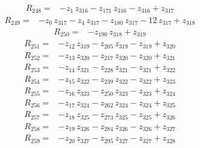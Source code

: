 \documentclass[10pt]{article}
\begin{document}
\begin{align*}
R_{248}={}& - z_{1}\,z_{316} - z_{171}\,z_{316} - z_{316} + z_{317}
\end{align*}
\begin{align*}
R_{249}={}& - z_{0}\,z_{317} - z_{4}\,z_{317} - z_{180}\,z_{317} - 12\,z_{317} + z_{318}
\end{align*}
\begin{align*}
R_{250}={}& - z_{190}\,z_{318} + z_{319}
\end{align*}
\begin{align*}
R_{251}={}& - z_{12}\,z_{319} - z_{205}\,z_{319} - z_{319} + z_{320}
\end{align*}
\begin{align*}
R_{252}={}& - z_{13}\,z_{320} - z_{217}\,z_{320} - z_{320} + z_{321}
\end{align*}
\begin{align*}
R_{253}={}& - z_{14}\,z_{321} - z_{228}\,z_{321} - z_{321} + z_{322}
\end{align*}
\begin{align*}
R_{254}={}& - z_{15}\,z_{322} - z_{239}\,z_{322} - z_{322} + z_{323}
\end{align*}
\begin{align*}
R_{255}={}& - z_{16}\,z_{323} - z_{250}\,z_{323} - z_{323} + z_{324}
\end{align*}
\begin{align*}
R_{256}={}& - z_{17}\,z_{324} - z_{262}\,z_{324} - z_{324} + z_{325}
\end{align*}
\begin{align*}
R_{257}={}& - z_{18}\,z_{325} - z_{273}\,z_{325} - z_{325} + z_{326}
\end{align*}
\begin{align*}
R_{258}={}& - z_{19}\,z_{326} - z_{284}\,z_{326} - z_{326} + z_{327}
\end{align*}
\begin{align*}
R_{259}={}& - z_{20}\,z_{327} - z_{295}\,z_{327} - z_{327} + z_{328}
\end{align*}
\end{document}
